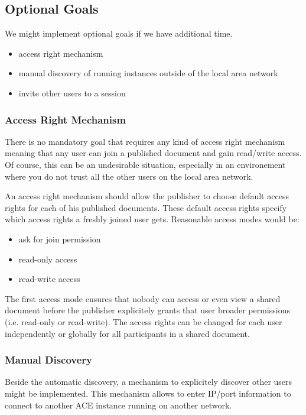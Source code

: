 \documentclass[11pt,a4paper]{article}
\begin{document}
\subsection{Optional Goals}

We might implement optional goals if we have additional time.

\begin{itemize}
 \item access right mechanism
 \item manual discovery of running instances outside of the local area network
 \item invite other users to a session 
\end{itemize}

\subsubsection{Access Right Mechanism}

There is no mandatory goal that requires any kind of access right mechanism 
meaning that any user can join a published document and gain read/write 
access. Of course, this can be an undesirable situation, especially in an 
environement where you do not trust all the other users on the local 
area network.

An access right mechanism should allow the publisher to choose default access 
rights for each of his published documents. These default access rights 
specify which access rights a freshly joined user gets. Reasonable access 
modes would be:

\begin{itemize}
 \item ask for join permission
 \item read-only access
 \item read-write access
\end{itemize}

The first access mode ensures that nobody can access or even view a shared 
document before the publisher explicitely grants that user broader permissions
(i.e. read-only or read-write). The access rights can be changed for each 
user independently or globally for all participants in a shared document.

\subsubsection{Manual Discovery}

Beside the automatic discovery, a mechanism to explicitely discover other users
might be implemented. This mechanism allows to enter IP/port information to
connect to another ACE instance running on another network.
\end{document}

